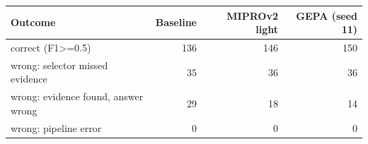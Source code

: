\begin{tabular}{lrrr}
\hline
Outcome & Baseline & MIPROv2 light & GEPA (seed 11) \\ \hline
correct (F1>=0.5) & 136 & 146 & 150 \\
wrong: selector missed evidence & 35 & 36 & 36 \\
wrong: evidence found, answer wrong & 29 & 18 & 14 \\
wrong: pipeline error & 0 & 0 & 0 \\
\hline
\end{tabular}
